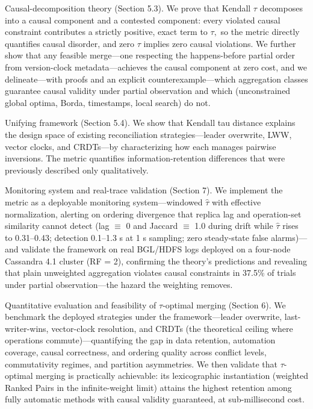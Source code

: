 \documentclass[journal]{IEEEtran}
\begin{document}
Causal-decomposition theory (Section 5.3). We prove that Kendall $\tau$ decomposes into a causal component and a contested component: every violated causal constraint contributes a strictly positive, exact term to $\tau,$ so the metric directly quantifies causal disorder, and zero $\tau$ implies zero causal violations. We further show that any feasible merge—one respecting the happens-before partial order from version-clock metadata—achieves the causal component at zero cost, and we delineate—with proofs and an explicit counterexample—which aggregation classes guarantee causal validity under partial observation and which (unconstrained global optima, Borda, timestamps, local search) do not.

Unifying framework (Section 5.4). We show that Kendall tau distance explains the design space of existing reconciliation strategies—leader overwrite, LWW, vector clocks, and CRDTs—by characterizing how each manages pairwise inversions. The metric quantifies information-retention differences that were previously described only qualitatively.

Monitoring system and real-trace validation (Section 7). We implement the metric as a deployable monitoring system—windowed $\hat{\tau}$ with effective normalization, alerting on ordering divergence that replica lag and operation-set similarity cannot detect (lag $\equiv$ 0 and Jaccard $\equiv$ 1.0 during drift while $\hat{\tau}$ rises to 0.31–0.43; detection 0.1–1.3 s at 1 s sampling; zero steady-state false alarms)—and validate the framework on real BGL/HDFS logs deployed on a four-node Cassandra 4.1 cluster (RF = 2), confirming the theory's predictions and revealing that plain unweighted aggregation violates causal constraints in 37.5\% of trials under partial observation—the hazard the weighting removes.

Quantitative evaluation and feasibility of $\tau$-optimal merging (Section 6). We benchmark the deployed strategies under the framework—leader overwrite, last-writer-wins, vector-clock resolution, and CRDTs (the theoretical ceiling where operations commute)—quantifying the gap in data retention, automation coverage, causal correctness, and ordering quality across conflict levels, commutativity regimes, and partition asymmetries. We then validate that $\tau$-optimal merging is practically achievable: its lexicographic instantiation (weighted Ranked Pairs in the infinite-weight limit) attains the highest retention among fully automatic methods with causal validity guaranteed, at sub-millisecond cost.
\end{document}

